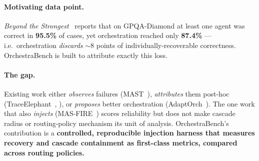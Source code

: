 \documentclass[sigconf,nonacm,anonymous]{acmart}  %
\begin{document}
\paragraph{Motivating data point.} \emph{Beyond the
Strongest}~\cite{beyondstrongest} reports that on GPQA-Diamond at least one agent
was correct in \textbf{95.5\%} of cases, yet orchestration reached only
\textbf{87.4\%} --- i.e.\ orchestration \emph{discards} $\sim$8 points of
individually-recoverable correctness. OrchestraBench is built to attribute
exactly this loss.

\paragraph{The gap.} Existing work either \emph{observes} failures
(MAST~\cite{mast}), \emph{attributes} them post-hoc
(TraceElephant~\cite{traceelephant}, \cite{attribution}), or \emph{proposes}
better orchestration (AdaptOrch~\cite{adaptorch}). The one work that also
\emph{injects} (MAS-FIRE~\cite{masfire}) scores reliability but does not make
cascade radius or routing-policy mechanism its unit of analysis. OrchestraBench's
contribution is a \textbf{controlled, reproducible injection harness that
measures recovery and cascade containment as first-class metrics, compared across
routing policies.}
\end{document}
